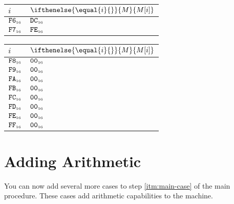 \documentclass[a4paper,12pt]{article}
\makeatletter
\newcommand{\num}[1]{\texttt{#1}}
\newcommand{\hex}[1]{\num{#1}_{\textup{\tiny 16}}}
\newcommand{\MEM}[1]{\ifthenelse{\equal{#1}{}}{M}{M[#1]}}
\newenvironment{memtable}{%
  \begin{trivlist}
    \item
    }{%
    \end{trivlist}}
\newenvironment{memcolumn}{%
  \begin{tabular}{@{}ll@{}}
    $i$ & $\MEM{i}$ \\
    \hline}
    {%
    \hline
  \end{tabular}}
\newcommand{\memspace}{\qquad}
\makeatother
\begin{document}
\begin{memtable}
\begin{memcolumn}
    $\hex{F6}$ & $\hex{DC}$ \\
    $\hex{F7}$ & $\hex{FE}$ \\
  \end{memcolumn}
  \memspace
  \begin{memcolumn}
    $\hex{F8}$ & $\hex{00}$ \\
    $\hex{F9}$ & $\hex{00}$ \\
    $\hex{FA}$ & $\hex{00}$ \\
    $\hex{FB}$ & $\hex{00}$ \\
    $\hex{FC}$ & $\hex{00}$ \\
    $\hex{FD}$ & $\hex{00}$ \\
    $\hex{FE}$ & $\hex{00}$ \\
    $\hex{FF}$ & $\hex{00}$ \\
  \end{memcolumn}
\end{memtable}

\section{Adding Arithmetic}

You can now add several more cases to step \ref{itm:main-case} of the main procedure.
These cases add arithmetic capabilities to the machine.
\end{document}
